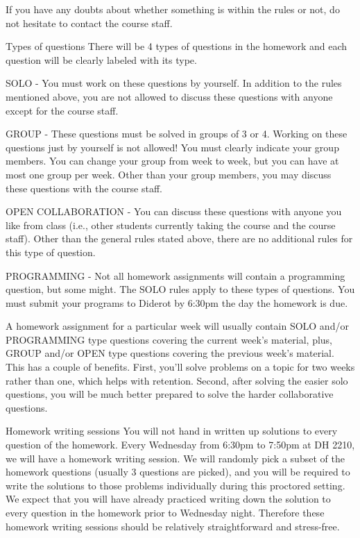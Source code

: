 If you have any doubts about whether something is within the rules or not, do not hesitate to contact the course staff.

 
Types of questions
There will be 4 types of questions in the homework and each question will be clearly labeled with its type.

SOLO - You must work on these questions by yourself. In addition to the rules mentioned above, you are not allowed to discuss these questions with anyone except for the course staff.

GROUP - These questions must be solved in groups of 3 or 4. Working on these questions just by yourself is not allowed! You must clearly indicate your group members. You can change your group from week to week, but you can have at most one group per week. Other than your group members, you may discuss these questions with the course staff.

OPEN COLLABORATION - You can discuss these questions with anyone you like from class (i.e., other students currently taking the course and the course staff). Other than the general rules stated above, there are no additional rules for this type of question.

PROGRAMMING - Not all homework assignments will contain a programming question, but some might. The SOLO rules apply to these types of questions. You must submit your programs to Diderot by 6:30pm the day the homework is due.

A homework assignment for a particular week will usually contain SOLO and/or PROGRAMMING type questions covering the current week’s material, plus, GROUP and/or OPEN type questions covering the previous week’s material. This has a couple of benefits. First, you’ll solve problems on a topic for two weeks rather than one, which helps with retention. Second, after solving the easier solo questions, you will be much better prepared to solve the harder collaborative questions.

 
Homework writing sessions
You will not hand in written up solutions to every question of the homework. Every Wednesday from 6:30pm to 7:50pm at DH 2210, we will have a homework writing session. We will randomly pick a subset of the homework questions (usually 3 questions are picked), and you will be required to write the solutions to those problems individually during this proctored setting. We expect that you will have already practiced writing down the solution to every question in the homework prior to Wednesday night. Therefore these homework writing sessions should be relatively straightforward and stress-free.


